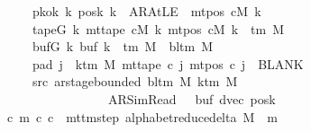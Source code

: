 \begin{isabellebody}
\ \ \ \ \ \ \ pkok{\isacharcolon}{\kern0pt}\ {\isachardoublequoteopen}{\isasymAnd}k{\isachardot}{\kern0pt}\ posk{}\ k\ {\isacharequal}{\kern0pt}\ AR{\isacharunderscore}{\kern0pt}AtLE\ {\isasymlongleftrightarrow}\ mt{\isacharunderscore}{\kern0pt}pos\ cM\ k\ {\isacharequal}{\kern0pt}\ {}{\isachardoublequoteclose}\isanewline
\ \ \ \ \ \ \ tapeG{\isacharcolon}{\kern0pt}\ {\isachardoublequoteopen}{\isasymAnd}k{\isachardot}{\kern0pt}\ mt{\isacharunderscore}{\kern0pt}tape\ cM\ k\ {\isacharparenleft}{\kern0pt}mt{\isacharunderscore}{\kern0pt}pos\ cM\ k{\isacharparenright}{\kern0pt}\ {\isasymin}\ {\isasymGamma}{\isacharunderscore}{\kern0pt}tm\ M{\isachardoublequoteclose}\isanewline
\ \ \ \ \ \ \ bufG{\isacharcolon}{\kern0pt}\ {\isachardoublequoteopen}{\isasymAnd}k{\isachardot}{\kern0pt}\ buf{}\ k\ {\isasymin}\ {\isasymGamma}{\isacharunderscore}{\kern0pt}tm\ M\ {\isasymunion}\ {\isacharbraceleft}{\kern0pt}bl{\isacharunderscore}{\kern0pt}tm\ M{\isacharbraceright}{\kern0pt}{\isachardoublequoteclose}\isanewline
\ \ \ \ \ \ \ pad{}{\isacharcolon}{\kern0pt}\ {\isachardoublequoteopen}{\isasymforall}j\ {\isasymge}\ k{\isacharunderscore}{\kern0pt}tm\ M{\isachardot}{\kern0pt}\ mt{\isacharunderscore}{\kern0pt}tape\ c{}\ j\ {\isacharparenleft}{\kern0pt}mt{\isacharunderscore}{\kern0pt}pos\ c{}\ j{\isacharparenright}{\kern0pt}\ {\isacharequal}{\kern0pt}\ BLANK{}{\isachardoublequoteclose}\isanewline
\ \ \ \ \ \ \ src{}{\isacharcolon}{\kern0pt}\ {\isachardoublequoteopen}ar{\isacharunderscore}{\kern0pt}stage{\isacharunderscore}{\kern0pt}bounded\ {\isacharparenleft}{\kern0pt}bl{\isacharunderscore}{\kern0pt}tm\ M{\isacharparenright}{\kern0pt}\ {\isacharparenleft}{\kern0pt}k{\isacharunderscore}{\kern0pt}tm\ M{\isacharparenright}{\kern0pt}\isanewline
\ \ \ \ \ \ \ \ \ \ \ \ \ \ \ \ \ \ \ {\isacharparenleft}{\kern0pt}AR{\isacharunderscore}{\kern0pt}SimRead{\isacharcomma}{\kern0pt}\ {}{\isacharcomma}{\kern0pt}\ {}{\isacharcomma}{\kern0pt}\ buf{}{\isacharcomma}{\kern0pt}\ dvec{\isacharcomma}{\kern0pt}\ posk{}{\isacharparenright}{\kern0pt}{\isachardoublequoteclose}\isanewline
\ \ \ {\isachardoublequoteopen}{\isasymexists}c\ m{\isachardot}{\kern0pt}\ {\isacharparenleft}{\kern0pt}c{}{\isacharcomma}{\kern0pt}\ c{\isacharparenright}{\kern0pt}\ {\isasymin}\ {\isacharparenleft}{\kern0pt}mttm{\isacharunderscore}{\kern0pt}step\ {\isacharparenleft}{\kern0pt}alphabet{\isacharunderscore}{\kern0pt}reduce{\isacharunderscore}{\kern0pt}delta\ M{\isacharparenright}{\kern0pt}{\isacharparenright}{\kern0pt}\ {\isacharcircum}{\kern0pt}{\isacharcircum}{\kern0pt}\ m\isanewline

\end{isabellebody}

